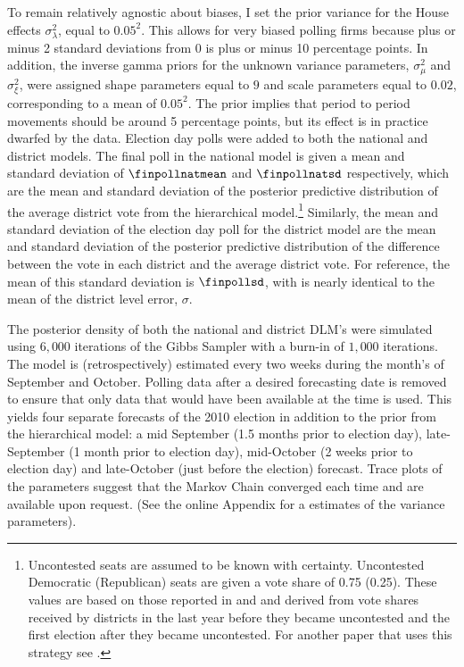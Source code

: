 \documentclass[12pt,final,fleqn]{article}
\theoremstyle{plain}
\begin{document}
To remain relatively agnostic about biases, I set the prior variance for the House effects $\sigma^2_\lambda$, equal to $0.05^2$. This allows for very biased polling firms because plus or minus 2 standard deviations from $0$ is plus or minus 10 percentage points. In addition, the inverse gamma priors for the unknown variance parameters, $\sigma_\mu^2$ and $\sigma_\xi^2$, were assigned shape parameters equal to $9$ and scale parameters equal to $0.02$, corresponding to a mean of $0.05^2$. The prior implies that period to period movements should be around 5 percentage points, but its effect is in practice dwarfed by the data. Election day polls were added to both the national and district models. The final poll in the national model is given a mean and standard deviation of $\finpollnatmean$ and  $\finpollnatsd$ respectively, which are the mean and standard deviation of the posterior predictive distribution of the average district vote from the hierarchical model.\footnote{Uncontested seats are assumed to be known with certainty. Uncontested Democratic (Republican) seats are given a vote share of 0.75 (0.25). These values are based on those reported in \citet{king1991systemic} and \citet{gelman1994unified} and derived from vote shares received by districts in the last year before they became uncontested and the first election after they became uncontested. For another paper that uses this strategy see \citet{kastellec2008predicting}.} Similarly, the mean and standard deviation of the election day poll for the district model are the mean and standard deviation of the posterior predictive distribution of the difference between the vote in each district and the average district vote. For reference, the mean of this standard deviation is $\finpollsd$, with is nearly identical to the mean of the district level error, $\sigma$.

The posterior density of both the national and district DLM's were simulated using $6,000$ iterations of the Gibbs Sampler with a burn-in of $1,000$ iterations. The model is (retrospectively) estimated every two weeks during the month's of September and October. Polling data after a desired forecasting date is removed to ensure that only data that would have been available at the time is used. This yields four separate forecasts of the 2010 election in addition to the prior from the hierarchical model: a mid September (1.5 months prior to election day), late-September (1 month prior to election day), mid-October (2 weeks prior to election day) and late-October (just before the election) forecast. Trace plots of the parameters suggest that the Markov Chain converged each time and are available upon request. (See the online Appendix for a estimates of the variance parameters).
\end{document}

